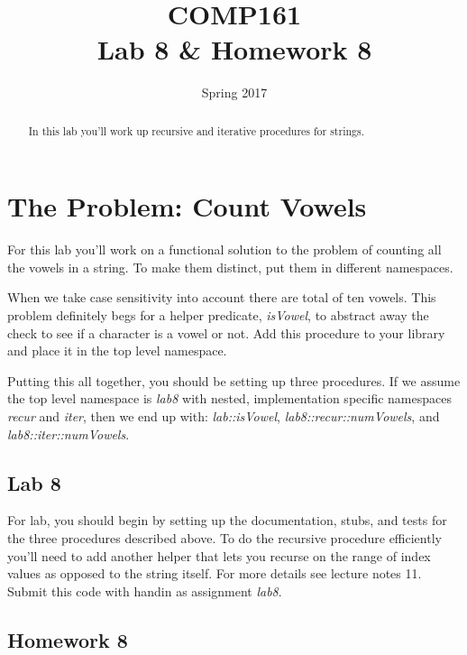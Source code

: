 \documentclass[nobib]{tufte-handout}
\title{COMP161 \\ Lab 8 \& Homework 8}
\author{}
\date{Spring 2017}
\begin{document}
\maketitle

\begin{abstract}
In this lab you'll work up recursive and iterative procedures for strings.
\end{abstract}

\section{The Problem: Count Vowels}

For this lab you'll work on a functional solution to the problem of counting all the vowels in a string. To make them distinct, put them in different namespaces.

When we take case sensitivity into account there are total of ten vowels. This problem definitely begs for a helper predicate, \textit{isVowel}, to abstract away the check to see if a character is a vowel or not.  Add this procedure to your library and place it in the top level namespace.

Putting this all together, you should be setting up three procedures. If we assume the top level namespace is \textit{lab8} with nested, implementation specific namespaces \textit{recur} and \textit{iter}, then we end up with: \textit{lab::isVowel}, \textit{lab8::recur::numVowels}, and \textit{lab8::iter::numVowels}.

\subsection*{Lab 8}

For lab, you should begin by setting up the documentation, stubs, and tests for the three procedures described above.  To do the recursive procedure efficiently you'll need to add another helper that lets you recurse on the range of index values as opposed to the string itself. For more details see lecture notes 11. Submit this code with handin as assignment \textit{lab8}.

\subsection*{Homework 8}
\end{document}
